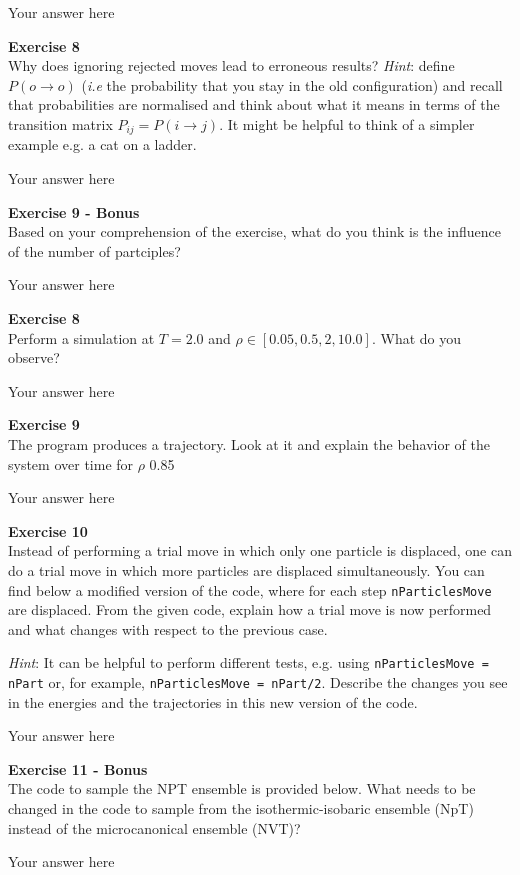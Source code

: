 \documentclass{article}
\begin{document}
Your answer here

\begin{mdframed}
\textbf{Exercise 8}\\
Why does ignoring rejected moves lead to erroneous results? \textit{Hint}: define $P(o \rightarrow o)$ (\textit{i.e}  the probability that you stay in the old configuration) and recall that probabilities are normalised and think about what it means in terms of the transition matrix $P_{ij} = P(i \rightarrow j)$. It might be helpful to think of a simpler example e.g. a cat on a ladder.
\end{mdframed}

Your answer here

\begin{mdframed}
\textbf{Exercise 9 - Bonus}\\
Based on your comprehension of the exercise, what do you think is the influence of the number of partciples?
\end{mdframed}

Your answer here

\begin{mdframed}
\textbf{Exercise 8}\\
Perform a simulation at $T = 2.0$ and $\rho \in [0.05, 0.5, 2, 10.0]$. What do you observe?
\end{mdframed}

Your answer here

\begin{mdframed}
\textbf{Exercise 9}\\
The program produces a trajectory. Look at it and explain the behavior of the system over time for $\rho$ 0.85
\end{mdframed}

Your answer here

\begin{mdframed}
\textbf{Exercise 10}\\
Instead of performing a trial move in which only one particle is displaced, one can do a trial move in which more particles are
displaced simultaneously. You can find below a modified version of the code, where for each step \texttt{nParticlesMove} are displaced.
From the given code, explain how a trial move is now performed and what changes with respect to the previous case.

\textit{Hint}: It can be helpful to perform different tests, e.g. using \texttt{nParticlesMove = nPart} or, for example, \texttt{nParticlesMove = nPart/2}. Describe the changes you see in the energies and the trajectories in this new version of the code.
\end{mdframed}

Your answer here

\begin{mdframed}
\textbf{Exercise 11 - Bonus}\\
The code to sample the NPT ensemble is provided below. What needs to be changed in the code to sample from the isothermic-isobaric ensemble (NpT) instead of the microcanonical ensemble (NVT)?
\end{mdframed}

Your answer here
\end{document}
